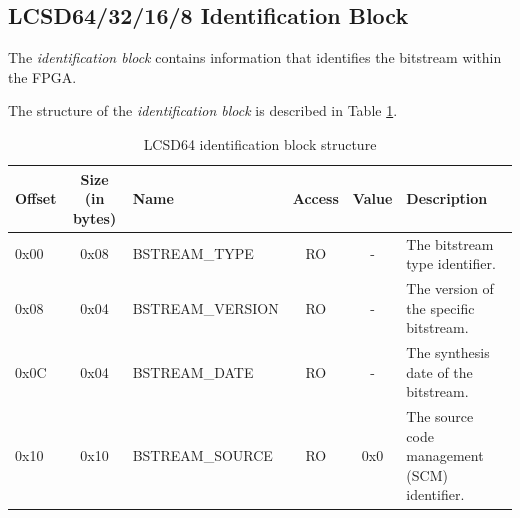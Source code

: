 \documentclass[a4paper, 12pt]{article}
\begin{document}
\subsection{LCSD64/32/16/8 Identification Block}\label{id_block}

The \emph{identification block} contains information that identifies the bitstream within the FPGA.

The structure of the \emph{identification block} is described in Table \ref{id_block_struct}.

\begin{center}
  \begin{savenotes}
    \begin{table}[!ht]\footnotesize
      \caption{LCSD64 identification block structure}\label{id_block_struct}\centering
      \begin{adjustwidth}{-0.4in}{-1in}%
        \begin{tabular}{| l | c | l | c | c | p{5cm} |} \hline
        Offset & Size (in bytes) & Name & Access & Value & Description \\ \hline
        0x00 & 0x08 & BSTREAM\_TYPE & RO & - & The bitstream type identifier. \\ \hline
        0x08 & 0x04 & BSTREAM\_VERSION & RO & - & The version of the specific bitstream. \\ \hline
        0x0C & 0x04 & BSTREAM\_DATE & RO & - & The synthesis date of the bitstream. \\ \hline
        0x10 & 0x10 & BSTREAM\_SOURCE & RO & 0x0 & The source code management (SCM) identifier. \\ \hline
        \end{tabular}
      \end{adjustwidth}
    \end{table}
  \end{savenotes}
\end{center}
\end{document}
